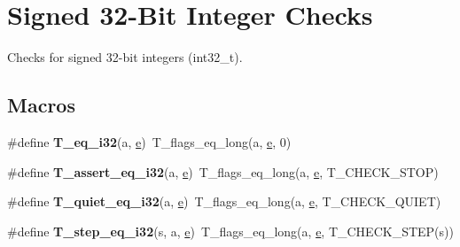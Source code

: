 \hypertarget{group__RTEMSTestFrameworkChecksInt32}{}\section{Signed 32-\/Bit Integer Checks}
\label{group__RTEMSTestFrameworkChecksInt32}


Checks for signed 32-\/bit integers (int32\+\_\+t).  


\subsection*{Macros}
\begin{DoxyCompactItemize}
\item 
\mbox{\label{group__RTEMSTestFrameworkChecksInt32_ga997584e8a70404715b722f00035eb210}} 
\#define {\bfseries T\+\_\+eq\+\_\+i32}(a,  \mbox{\hyperlink{sun4u_2tte_8h_a8b0b9ed08e0e18920ec2682f48228c27}{e}})~T\+\_\+flags\+\_\+eq\+\_\+long(a, \mbox{\hyperlink{sun4u_2tte_8h_a8b0b9ed08e0e18920ec2682f48228c27}{e}}, 0)
\item 
\mbox{\label{group__RTEMSTestFrameworkChecksInt32_gafe1a1b3a3b4c9773415f6dd1e1c590c6}} 
\#define {\bfseries T\+\_\+assert\+\_\+eq\+\_\+i32}(a,  \mbox{\hyperlink{sun4u_2tte_8h_a8b0b9ed08e0e18920ec2682f48228c27}{e}})~T\+\_\+flags\+\_\+eq\+\_\+long(a, \mbox{\hyperlink{sun4u_2tte_8h_a8b0b9ed08e0e18920ec2682f48228c27}{e}}, T\+\_\+\+C\+H\+E\+C\+K\+\_\+\+S\+T\+OP)
\item 
\mbox{\label{group__RTEMSTestFrameworkChecksInt32_ga7de3546517617a2618aa1bba69dfa5f9}} 
\#define {\bfseries T\+\_\+quiet\+\_\+eq\+\_\+i32}(a,  \mbox{\hyperlink{sun4u_2tte_8h_a8b0b9ed08e0e18920ec2682f48228c27}{e}})~T\+\_\+flags\+\_\+eq\+\_\+long(a, \mbox{\hyperlink{sun4u_2tte_8h_a8b0b9ed08e0e18920ec2682f48228c27}{e}}, T\+\_\+\+C\+H\+E\+C\+K\+\_\+\+Q\+U\+I\+ET)
\item 
\mbox{\label{group__RTEMSTestFrameworkChecksInt32_ga7ffd63355af9a311047c50c559a7539f}} 
\#define {\bfseries T\+\_\+step\+\_\+eq\+\_\+i32}(s,  a,  \mbox{\hyperlink{sun4u_2tte_8h_a8b0b9ed08e0e18920ec2682f48228c27}{e}})~T\+\_\+flags\+\_\+eq\+\_\+long(a, \mbox{\hyperlink{sun4u_2tte_8h_a8b0b9ed08e0e18920ec2682f48228c27}{e}}, T\+\_\+\+C\+H\+E\+C\+K\+\_\+\+S\+T\+EP(s))

\end{DoxyCompactItemize}
